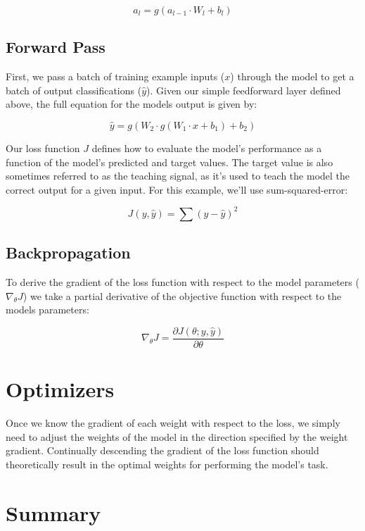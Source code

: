 \documentclass{templates/ucdenverthesis}
\begin{document}
\[
a_l = g(a_{l-1} \cdot W_l + b_l)
\]

\hypertarget{sec:fwdpass}{%
\subsection{Forward Pass}\label{sec:fwdpass}}

First, we pass a batch of training example inputs (\(x\)) through the model to get a batch of output classifications (\(\hat{y}\)). Given our simple feedforward layer defined above, the full equation for the models output is given by:

\[
\hat{y} = g(W_2 \cdot g(W_1 \cdot x +b_1) + b_2)
\]

Our loss function \(J\) defines how to evaluate the model's performance as a function of the model's predicted and target values. The target value is also sometimes referred to as the teaching signal, as it's used to teach the model the correct output for a given input. For this example, we'll use sum-squared-error:

\[
J(y,\hat{y}) = \sum (y-\hat{y})^2
\]

\hypertarget{sec:backprop}{%
\subsection{Backpropagation}\label{sec:backprop}}

To derive the gradient of the loss function with respect to the model parameters (\(\nabla_{\theta} J\)) we take a partial derivative of the objective function with respect to the models parameters:

\[
\nabla_{\theta} J = \frac{\partial J(\theta ; y, \hat{y})}{\partial \theta}
\]

\hypertarget{sec:optimizers}{%
\section{Optimizers}\label{sec:optimizers}}

Once we know the gradient of each weight with respect to the loss, we simply need to adjust the weights of the model in the direction specified by the weight gradient. Continually descending the gradient of the loss function should theoretically result in the optimal weights for performing the model's task.

\hypertarget{sec:ch2summary}{%
\section{Summary}\label{sec:ch2summary}}
\end{document}
